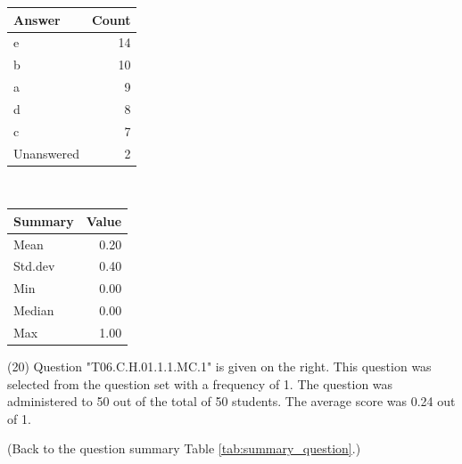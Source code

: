 \documentclass[12pt,english,nohyper]{tufte-handout}\usepackage[]{graphicx}\usepackage[]{color}
\begin{document}
\begin{center}%
\begin{tabular}{lr}
  \hline
Answer & Count \\ 
  \hline
e &  14 \\ 
  b &  10 \\ 
  a &   9 \\ 
  d &   8 \\ 
  c &   7 \\ 
  Unanswered &   2 \\ 
   \hline
\end{tabular}
~~~~~~~~%
\begin{tabular}{lr}
  \hline
Summary & Value \\ 
  \hline
Mean & 0.20 \\ 
  Std.dev & 0.40 \\ 
  Min & 0.00 \\ 
  Median & 0.00 \\ 
  Max & 1.00 \\ 
   \hline
\end{tabular}
\end{center}\newpage{} (20) Question "T06.C.H.01.1.1.MC.1" is given on the right. This question was selected from the question set with a frequency of 1. The question was administered to 50 out of the total of 50 students. The average score was 0.24 out of 1.

 (Back to the question summary Table \ref{tab:summary_question}.)
\end{document}
